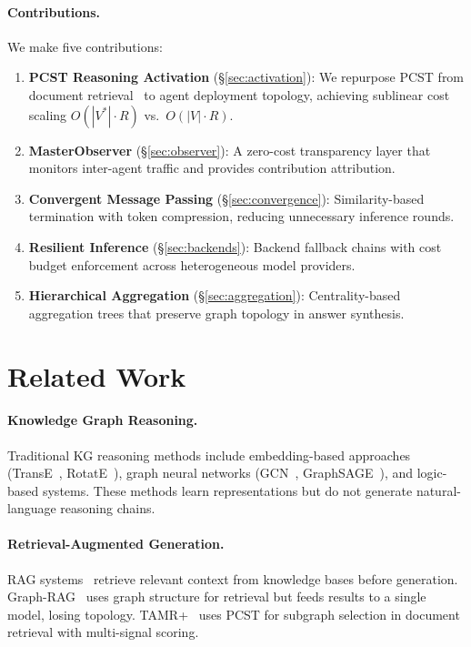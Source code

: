 \documentclass[a4paper,11pt]{article}
\theoremstyle{definition}
\begin{document}
\paragraph{Contributions.} We make five contributions:

\begin{enumerate}
\item \textbf{PCST Reasoning Activation} (\S\ref{sec:activation}): We repurpose PCST from document retrieval~\cite{tamrplus2026} to agent deployment topology, achieving sublinear cost scaling $O(|V^*| \cdot R)$ vs.\ $O(|V| \cdot R)$.
\item \textbf{MasterObserver} (\S\ref{sec:observer}): A zero-cost transparency layer that monitors inter-agent traffic and provides contribution attribution.
\item \textbf{Convergent Message Passing} (\S\ref{sec:convergence}): Similarity-based termination with token compression, reducing unnecessary inference rounds.
\item \textbf{Resilient Inference} (\S\ref{sec:backends}): Backend fallback chains with cost budget enforcement across heterogeneous model providers.
\item \textbf{Hierarchical Aggregation} (\S\ref{sec:aggregation}): Centrality-based aggregation trees that preserve graph topology in answer synthesis.
\end{enumerate}

\section{Related Work}
\label{sec:related}

\paragraph{Knowledge Graph Reasoning.}
Traditional KG reasoning methods include embedding-based approaches (TransE~\cite{transe2013}, RotatE~\cite{rotate2019}), graph neural networks (GCN~\cite{gcn2017}, GraphSAGE~\cite{graphsage2017}), and logic-based systems.
These methods learn representations but do not generate natural-language reasoning chains.

\paragraph{Retrieval-Augmented Generation.}
RAG systems~\cite{rag2020,graphrag2024} retrieve relevant context from knowledge bases before generation.
Graph-RAG~\cite{graphrag2024} uses graph structure for retrieval but feeds results to a single model, losing topology.
TAMR+~\cite{tamrplus2026} uses PCST for subgraph selection in document retrieval with multi-signal scoring.
\end{document}
